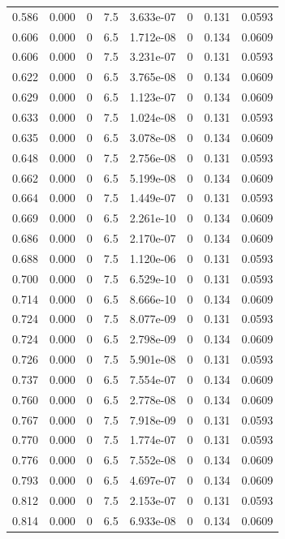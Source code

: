 \documentclass[preview]{standalone}
\begin{document}
{{{\begin{tabular}{L{1.2cm}C{1.2cm} C{0.3cm}C{0.5cm} C{1.4cm}C{1.4cm} C{1.4cm}C{1.4cm}}
  0.586  &  0.000  & 0     & 7.5 &  3.633e-07  & 0  & 0.131 &  0.0593   \\ 
  0.606  &  0.000  & 0     & 6.5 &  1.712e-08  & 0  & 0.134 &  0.0609   \\ 
  0.606  &  0.000  & 0     & 7.5 &  3.231e-07  & 0  & 0.131 &  0.0593   \\ 
  0.622  &  0.000  & 0     & 6.5 &  3.765e-08  & 0  & 0.134 &  0.0609   \\ 
  0.629  &  0.000  & 0     & 6.5 &  1.123e-07  & 0  & 0.134 &  0.0609   \\ 
  0.633  &  0.000  & 0     & 7.5 &  1.024e-08  & 0  & 0.131 &  0.0593   \\ 
  0.635  &  0.000  & 0     & 6.5 &  3.078e-08  & 0  & 0.134 &  0.0609   \\ 
  0.648  &  0.000  & 0     & 7.5 &  2.756e-08  & 0  & 0.131 &  0.0593   \\ 
  0.662  &  0.000  & 0     & 6.5 &  5.199e-08  & 0  & 0.134 &  0.0609   \\ 
  0.664  &  0.000  & 0     & 7.5 &  1.449e-07  & 0  & 0.131 &  0.0593   \\ 
  0.669  &  0.000  & 0     & 6.5 &  2.261e-10  & 0  & 0.134 &  0.0609   \\ 
  0.686  &  0.000  & 0     & 6.5 &  2.170e-07  & 0  & 0.134 &  0.0609   \\ 
  0.688  &  0.000  & 0     & 7.5 &  1.120e-06  & 0  & 0.131 &  0.0593   \\ 
  0.700  &  0.000  & 0     & 7.5 &  6.529e-10  & 0  & 0.131 &  0.0593   \\ 
  0.714  &  0.000  & 0     & 6.5 &  8.666e-10  & 0  & 0.134 &  0.0609   \\ 
  0.724  &  0.000  & 0     & 7.5 &  8.077e-09  & 0  & 0.131 &  0.0593   \\ 
  0.724  &  0.000  & 0     & 6.5 &  2.798e-09  & 0  & 0.134 &  0.0609   \\ 
  0.726  &  0.000  & 0     & 7.5 &  5.901e-08  & 0  & 0.131 &  0.0593   \\ 
  0.737  &  0.000  & 0     & 6.5 &  7.554e-07  & 0  & 0.134 &  0.0609   \\ 
  0.760  &  0.000  & 0     & 6.5 &  2.778e-08  & 0  & 0.134 &  0.0609   \\ 
  0.767  &  0.000  & 0     & 7.5 &  7.918e-09  & 0  & 0.131 &  0.0593   \\ 
  0.770  &  0.000  & 0     & 7.5 &  1.774e-07  & 0  & 0.131 &  0.0593   \\ 
  0.776  &  0.000  & 0     & 6.5 &  7.552e-08  & 0  & 0.134 &  0.0609   \\ 
  0.793  &  0.000  & 0     & 6.5 &  4.697e-07  & 0  & 0.134 &  0.0609   \\ 
  0.812  &  0.000  & 0     & 7.5 &  2.153e-07  & 0  & 0.131 &  0.0593   \\ 
  0.814  &  0.000  & 0     & 6.5 &  6.933e-08  & 0  & 0.134 &  0.0609   \\ 
\hline 
\end{tabular} 

}}}
\end{document}
